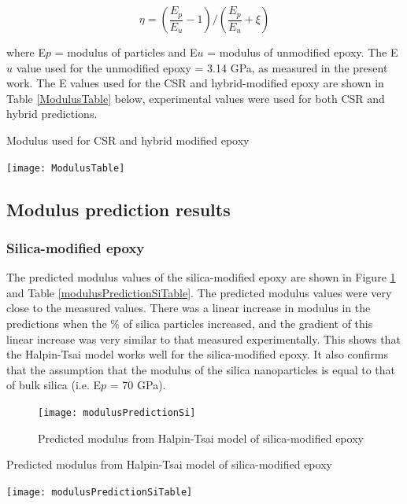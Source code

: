 \documentclass[numbers=noendperiod,chapterprefix=on]{icldt} %
\begin{document}
\begin{equation} 
\eta=\left(\frac{E_p}{E_u} -1\right)/\left(\frac{E_p}{E_u }+\xi\right)
\end{equation}

where E$ p $ = modulus of particles and E$ u $ = modulus of unmodified epoxy. 
The E$ u $ value used for the unmodified epoxy = 3.14 GPa, as measured in the present work. The E values used for the CSR and hybrid-modified epoxy are shown in Table \ref{ModulusTable} below, experimental values were used for both CSR and hybrid predictions.

\begin{table}[!htpb]
\centering
\caption{Modulus used for CSR and hybrid modified epoxy} \label{ModulusTable}
\texttt{[image: ModulusTable]}
\end{table}
\FloatBarrier

\subsection{Modulus prediction results}

\subsubsection{Silica-modified epoxy}
The predicted modulus values of the silica-modified epoxy are shown in Figure \ref{modulusPredictionSi} and Table \ref{modulusPredictionSiTable}. The predicted modulus values were very close to the measured values. There was a linear increase in modulus in the predictions when the \% of silica particles increased, and the gradient of this linear increase was very similar to that measured experimentally. This shows that the Halpin-Tsai model works well for the silica-modified epoxy. It also confirms that the assumption that the modulus of the silica nanoparticles is equal to that of bulk silica (i.e. E$ p $ = 70 GPa).

\begin{figure}[!htpb]
\centering
\texttt{[image: modulusPredictionSi]}
\caption{Predicted modulus from Halpin-Tsai model of silica-modified epoxy} \label{modulusPredictionSi}
\end{figure}
\FloatBarrier

\begin{table}[!htpb]
\centering
\caption{Predicted modulus from Halpin-Tsai model of silica-modified epoxy} \label{modulusPredictionSiTable}
\texttt{[image: modulusPredictionSiTable]}
\end{table}
\FloatBarrier
\end{document}
